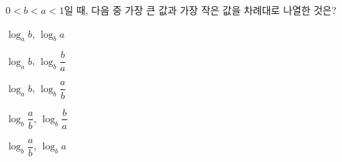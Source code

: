 $0<b<a<1$일 때, 다음 중 가장 큰 값과 가장 작은 값을 차례대로 나열한 것은?
\begin{choicesii}{\rule[-3ex]{0pt}{8ex}$\log_a b$, $\log_b a$}{\rule[-3ex]{0pt}{8ex}$\log_a b$, $\log_b \dfrac{b}{a}$}{\rule[-3ex]{0pt}{8ex}$\log_a b$, $\log_b \dfrac{a}{b}$}{\rule[-3ex]{0pt}{8ex}$\log_b \dfrac{a}{b}$, $\log_b \dfrac{b}{a}$}{\rule[-3ex]{0pt}{8ex}$\log_b \dfrac{a}{b}$, $\log_b a$}\end{choicesii}
